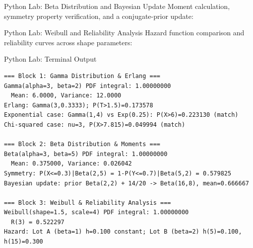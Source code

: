 \documentclass[aspectratio=169,xcolor={dvipsnames,table}]{beamer}
\begin{document}
\begin{frame}[fragile]{Python Lab: Beta Distribution and Bayesian Update}
	\vspace{-0.05cm}
	\scriptsize
	Moment calculation, symmetry property verification, and a conjugate-prior update:
	{
	}
\end{frame}

\begin{frame}[fragile]{Python Lab: Weibull and Reliability Analysis}
	\vspace{-0.05cm}
	\scriptsize
	Hazard function comparison and reliability curves across shape parameters:
	{
	}
\end{frame}

\begin{frame}[fragile]{Python Lab: Terminal Output}
	\vspace{-0.1cm}
	\begin{block}{}
		\fontsize{4pt}{5pt}\selectfont
		\begin{verbatim}
=== Block 1: Gamma Distribution & Erlang ===
Gamma(alpha=3, beta=2) PDF integral: 1.00000000
  Mean: 6.0000, Variance: 12.0000
Erlang: Gamma(3,0.3333); P(T>1.5)=0.173578
Exponential case: Gamma(1,4) vs Exp(0.25): P(X>6)=0.223130 (match)
Chi-squared case: nu=3, P(X>7.815)=0.049994 (match)

=== Block 2: Beta Distribution & Moments ===
Beta(alpha=3, beta=5) PDF integral: 1.00000000
  Mean: 0.375000, Variance: 0.026042
Symmetry: P(X<=0.3)|Beta(2,5) = 1-P(Y<=0.7)|Beta(5,2) = 0.579825
Bayesian update: prior Beta(2,2) + 14/20 -> Beta(16,8), mean=0.666667

=== Block 3: Weibull & Reliability Analysis ===
Weibull(shape=1.5, scale=4) PDF integral: 1.00000000
  R(3) = 0.522297
Hazard: Lot A (beta=1) h=0.100 constant; Lot B (beta=2) h(5)=0.100, h(15)=0.300
		\end{verbatim}
	\end{block}
\end{frame}
\end{document}
